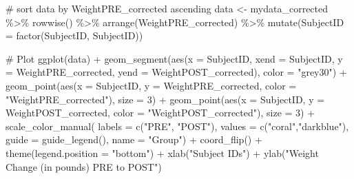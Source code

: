 \documentclass[
  letterpaper,
  DIV=11,
  numbers=noendperiod]{scrartcl}
\newenvironment{Shaded}{\begin{snugshade}}{\end{snugshade}}
\newcommand{\AttributeTok}[1]{\textcolor[rgb]{0.40,0.45,0.13}{#1}}
\newcommand{\CommentTok}[1]{\textcolor[rgb]{0.37,0.37,0.37}{#1}}
\newcommand{\DecValTok}[1]{\textcolor[rgb]{0.68,0.00,0.00}{#1}}
\newcommand{\FunctionTok}[1]{\textcolor[rgb]{0.28,0.35,0.67}{#1}}
\newcommand{\NormalTok}[1]{\textcolor[rgb]{0.00,0.23,0.31}{#1}}
\newcommand{\OtherTok}[1]{\textcolor[rgb]{0.00,0.23,0.31}{#1}}
\newcommand{\SpecialCharTok}[1]{\textcolor[rgb]{0.37,0.37,0.37}{#1}}
\newcommand{\StringTok}[1]{\textcolor[rgb]{0.13,0.47,0.30}{#1}}
\begin{document}
\begin{Shaded}
\begin{Highlighting}[]
\CommentTok{\# sort data by WeightPRE\_corrected ascending}
\NormalTok{data }\OtherTok{\textless{}{-}}\NormalTok{ mydata\_corrected }\SpecialCharTok{\%\textgreater{}\%}
  \FunctionTok{rowwise}\NormalTok{() }\SpecialCharTok{\%\textgreater{}\%}
  \FunctionTok{arrange}\NormalTok{(WeightPRE\_corrected) }\SpecialCharTok{\%\textgreater{}\%}
  \FunctionTok{mutate}\NormalTok{(}\AttributeTok{SubjectID =} \FunctionTok{factor}\NormalTok{(SubjectID, SubjectID))}

\CommentTok{\# Plot}
\FunctionTok{ggplot}\NormalTok{(data) }\SpecialCharTok{+}
  \FunctionTok{geom\_segment}\NormalTok{(}\FunctionTok{aes}\NormalTok{(}\AttributeTok{x =}\NormalTok{ SubjectID,}
                   \AttributeTok{xend =}\NormalTok{ SubjectID,}
                   \AttributeTok{y =}\NormalTok{ WeightPRE\_corrected,}
                   \AttributeTok{yend =}\NormalTok{ WeightPOST\_corrected), }
    \AttributeTok{color =} \StringTok{"grey30"}\NormalTok{) }\SpecialCharTok{+}
  \FunctionTok{geom\_point}\NormalTok{(}\FunctionTok{aes}\NormalTok{(}\AttributeTok{x =}\NormalTok{ SubjectID, }
                 \AttributeTok{y =}\NormalTok{ WeightPRE\_corrected,}
                 \AttributeTok{color =} \StringTok{"WeightPRE\_corrected"}\NormalTok{),}
             \AttributeTok{size =} \DecValTok{3}\NormalTok{) }\SpecialCharTok{+}
  \FunctionTok{geom\_point}\NormalTok{(}\FunctionTok{aes}\NormalTok{(}\AttributeTok{x =}\NormalTok{ SubjectID, }
                 \AttributeTok{y =}\NormalTok{ WeightPOST\_corrected,}
                 \AttributeTok{color =} \StringTok{"WeightPOST\_corrected"}\NormalTok{),}
             \AttributeTok{size =} \DecValTok{3}\NormalTok{) }\SpecialCharTok{+}
  \FunctionTok{scale\_color\_manual}\NormalTok{(}
    \AttributeTok{labels =} \FunctionTok{c}\NormalTok{(}\StringTok{"PRE"}\NormalTok{, }\StringTok{"POST"}\NormalTok{),}
    \AttributeTok{values =} \FunctionTok{c}\NormalTok{(}\StringTok{"coral"}\NormalTok{,}\StringTok{"darkblue"}\NormalTok{),}
    \AttributeTok{guide  =} \FunctionTok{guide\_legend}\NormalTok{(), }
    \AttributeTok{name   =} \StringTok{"Group"}\NormalTok{) }\SpecialCharTok{+}
  \FunctionTok{coord\_flip}\NormalTok{() }\SpecialCharTok{+}
  \FunctionTok{theme}\NormalTok{(}\AttributeTok{legend.position =} \StringTok{"bottom"}\NormalTok{) }\SpecialCharTok{+}
  \FunctionTok{xlab}\NormalTok{(}\StringTok{"Subject IDs"}\NormalTok{) }\SpecialCharTok{+}
  \FunctionTok{ylab}\NormalTok{(}\StringTok{"Weight Change (in pounds) PRE to POST"}\NormalTok{)}
\end{Highlighting}
\end{Shaded}
\end{document}
